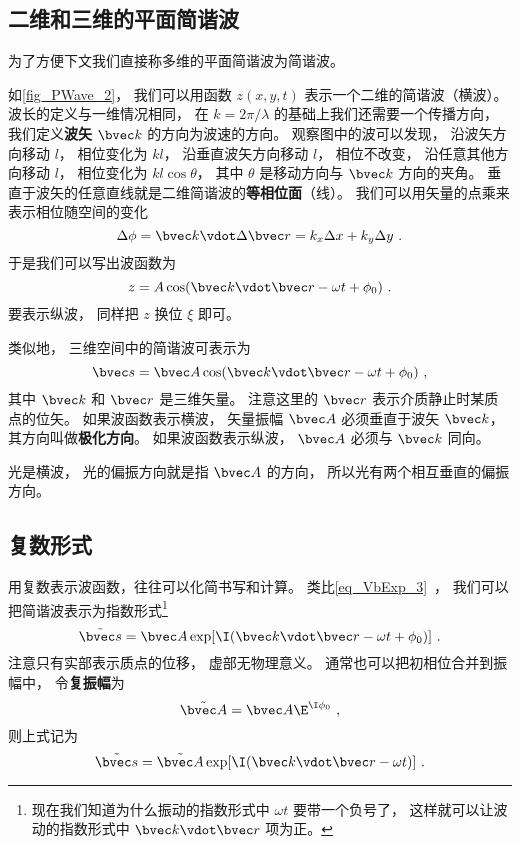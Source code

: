 \subsection{二维和三维的平面简谐波}
为了方便下文我们直接称多维的平面简谐波为简谐波。

如\autoref{fig_PWave_2}， 我们可以用函数 $z(x,y,t)$ 表示一个二维的简谐波（横波）。 波长的定义与一维情况相同， 在 $k = 2\pi/\lambda$ 的基础上我们还需要一个传播方向， 我们定义\textbf{波矢} $\bvec k$ 的方向为波速的方向。
观察图中的波可以发现， 沿波矢方向移动 $l$， 相位变化为 $kl$， 沿垂直波矢方向移动 $l$， 相位不改变， 沿任意其他方向移动 $l$， 相位变化为 $kl\cos\theta$， 其中 $\theta$ 是移动方向与 $\bvec k$ 方向的夹角。 垂直于波矢的任意直线就是二维简谐波的\textbf{等相位面}（线）。 我们可以用矢量的点乘来表示相位随空间的变化
\begin{equation}
\Delta\phi = \bvec k \vdot \Delta\bvec r = k_x \Delta x + k_y \Delta y~.
\end{equation}
于是我们可以写出波函数为
\begin{equation}\label{eq_PWave_8}
z = A \cos(\bvec k \vdot \bvec r - \omega t + \phi_0)~.
\end{equation}
要表示纵波， 同样把 $z$ 换位 $\xi$ 即可。

类似地， 三维空间中的简谐波可表示为
\begin{equation}
\bvec s = \bvec A \cos(\bvec k \vdot \bvec r - \omega t + \phi_0)~,
\end{equation}
其中 $\bvec k$ 和 $\bvec r$ 是三维矢量。 注意这里的 $\bvec r$ 表示介质静止时某质点的位矢。 如果波函数表示横波， 矢量振幅 $\bvec A$ 必须垂直于波矢 $\bvec k$， 其方向叫做\textbf{极化方向}。 如果波函数表示纵波， $\bvec A$ 必须与 $\bvec k$ 同向。

光是横波， 光的偏振方向就是指 $\bvec A$ 的方向， 所以光有两个相互垂直的偏振方向。

\subsection{复数形式}

用复数表示波函数，往往可以化简书写和计算。 类比\autoref{eq_VbExp_3}~， 我们可以把简谐波表示为指数形式\footnote{现在我们知道为什么振动的指数形式中 $\omega t$ 要带一个负号了， 这样就可以让波动的指数形式中 $\bvec k\vdot \bvec r$ 项为正。}
\begin{equation}
\tilde {\bvec s} = \bvec A \exp[\I( \bvec k \vdot \bvec r - \omega t + \phi_0)]~.
\end{equation}
注意只有实部表示质点的位移， 虚部无物理意义。 通常也可以把初相位合并到振幅中， 令\textbf{复振幅}为
\begin{equation}
\tilde {\bvec A} = \bvec A \E^{\I \phi_0}~,
\end{equation}
则上式记为
\begin{equation}
\tilde {\bvec s} = \tilde {\bvec A} \exp[\I( \bvec k \vdot \bvec r - \omega t)]~.
\end{equation}
